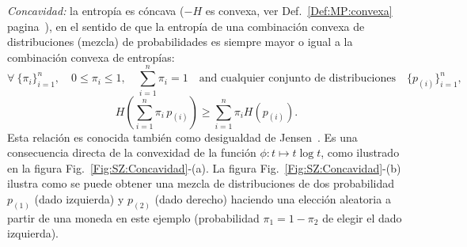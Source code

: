 \begin{propiedades}
  \begin{figure}[h!]
  \begin{center}  \end{center}
  \label{Fig:SZ:Recursividad}
  \end{figure}
%
\setcounter{PropConcavidad}{\value{enumi}}
\item\label{Prop:SZ:concavidad}  {\it Concavidad:}  la  entrop\'ia es  c\'oncava
  ($-H$         es         convexa,        ver         Def.~\ref{Def:MP:convexa}
  pagina~\pageref{Def:MP:convexa}), en  el sentido de  que la entrop\'ia  de una
  combinaci\'on convexa de distribuciones  (mezcla) de probabilidades es siempre
  mayor o igual a la combinaci\'on convexa de entrop\'ias:
  \[
  \forall \:  \{ \pi_i \}_{i=1}^n, \quad  0 \le \pi_i \le  1, \quad \sum_{i=1}^n
  \pi_i  = 1  \quad \mbox{and  cualquier  conjunto de  distribuciones} \quad  \{
  p_{(i)} \}_{i=1}^n,
  \]
  \[
  H\left( \sum_{i=1}^n \pi_i \, p_{(i)} \right) \ge \sum_{i=1}^n \pi_i H(p_{(i)}).
  \]
  Esta relaci\'on es conocida tambi\'en como desigualdad de Jensen~\cite{Jen06}.
  Es una consecuencia directa de la  convexidad de la funci\'on $\phi: t \mapsto
  t \log  t$, como ilustrado en la  figura Fig.~\ref{Fig:SZ:Concavidad}-(a).  La
  figura  Fig.~\ref{Fig:SZ:Concavidad}-(b)  ilustra como  se  puede obtener  una
  mezcla  de distribuciones  de dos  probabilidad $p_{(1)}$  (dado  izquierda) y
  $p_{(2)}$ (dado  derecho) haciendo  una elecci\'on aleatoria  a partir  de una
  moneda en  este ejemplo (probabilidad  $\pi_1 = 1  - \pi_2$ de elegir  el dado
  izquierda).\newline
  \begin{figure}[h!]
  \begin{center}  \end{center}
\end{figure}
\end{propiedades}
